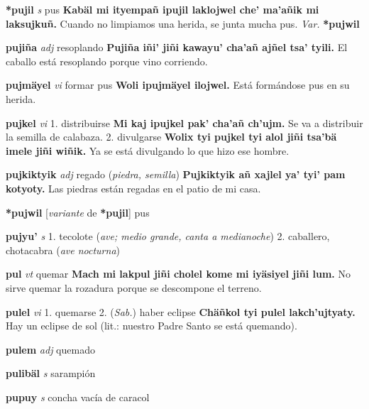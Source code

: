 \documentclass[10pt]{scrbook}
\newcommand{\entry}[1]{\textbf{#1}}
\newcommand{\onedefinition}[1]{#1.}
\newcommand{\partofspeech}[1]{\textit{#1}}
\newcommand{\spanishtranslation}[1]{#1}
\newcommand{\clarification}[1]{(\textit{#1})}
\newcommand{\cholexample}[1]{\textbf{#1}}
\newcommand{\exampletranslation}[1]{#1}
\newcommand{\relevantdialect}[1]{(\textit{#1})}
\newcommand{\variation}[1]{\textit{Var.} \textbf{#1}}
\newcommand{\conjugationtense}[1]{[\textit{#1}}
\newcommand{\conjugationverb}[1]{de \textbf{#1}]}
\begin{document}
\begin{multicols}{2}
\entry{*pujil}
\partofspeech{s}
\spanishtranslation{pus}
\cholexample{Kabäl mi ityempañ ipujil laklojwel che' ma'añik mi laksujkuñ.}
\exampletranslation{Cuando no limpiamos una herida, se junta mucha pus.}
\variation{*pujwil}

\entry{pujiña}
\partofspeech{adj}
\spanishtranslation{resoplando}
\cholexample{Pujiña iñi' jiñi kawayu' cha'añ ajñel tsa' tyili.}
\exampletranslation{El caballo está resoplando porque vino corriendo.}

\entry{pujmäyel}
\partofspeech{vi}
\spanishtranslation{formar pus}
\cholexample{Woli ipujmäyel ilojwel.}
\exampletranslation{Está formándose pus en su herida.}

\entry{pujkel}
\partofspeech{vi}
\onedefinition{1}
\spanishtranslation{distribuirse}
\cholexample{Mi kaj ipujkel pak' cha'añ ch'ujm.}
\exampletranslation{Se va a distribuir la semilla de calabaza.}
\onedefinition{2}
\spanishtranslation{divulgarse}
\cholexample{Wolix tyi pujkel tyi alol jiñi tsa'bä imele jiñi wiñik.}
\exampletranslation{Ya se está divulgando lo que hizo ese hombre.}

\entry{pujkiktyik}
\partofspeech{adj}
\spanishtranslation{regado}
\clarification{piedra, semilla}
\cholexample{Pujkiktyik añ xajlel ya' tyi' pam kotyoty.}
\exampletranslation{Las piedras están regadas en el patio de mi casa.}

\entry{*pujwil}
\conjugationtense{variante}
\conjugationverb{*pujil}
\spanishtranslation{pus}

\entry{pujyu'}
\partofspeech{s}
\onedefinition{1}
\spanishtranslation{tecolote}
\clarification{ave; medio grande, canta a medianoche}
\onedefinition{2}
\spanishtranslation{caballero, chotacabra}
\clarification{ave nocturna}

\entry{pul}
\partofspeech{vt}
\spanishtranslation{quemar}
\cholexample{Mach mi lakpul jiñi cholel kome mi iyäsiyel jiñi lum.}
\exampletranslation{No sirve quemar la rozadura porque se descompone el terreno.}

\entry{pulel}
\partofspeech{vi}
\onedefinition{1}
\spanishtranslation{quemarse}
\onedefinition{2}
\relevantdialect{Sab.}
\spanishtranslation{haber eclipse}
\cholexample{Chäñkol tyi pulel lakch'ujtyaty.}
\exampletranslation{Hay un eclipse de sol (lit.: nuestro Padre Santo se está quemando).}

\entry{pulem}
\partofspeech{adj}
\spanishtranslation{quemado}

\entry{pulibäl}
\partofspeech{s}
\spanishtranslation{sarampión}

\entry{pupuy}
\partofspeech{s}
\spanishtranslation{concha vacía de caracol}


\end{multicols}
\end{document}
